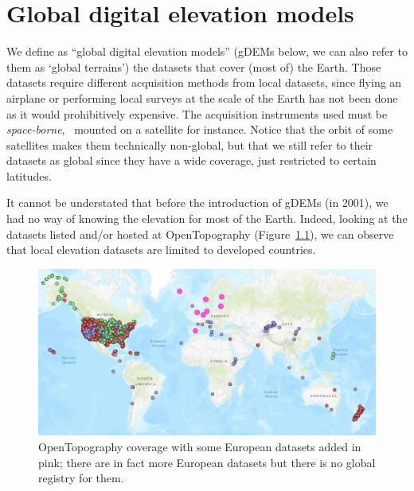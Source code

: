 
\setchapterpreamble[u]{\margintoc}
\graphicspath{{gdem/figs/}}


\chapter{Global digital elevation models}%
\label{chap:gdem}

We define as ``global digital elevation models'' (gDEMs below, we can also refer to them as `global terrains') the datasets that cover (most of) the Earth.%
Those datasets require different acquisition methods from local datasets, since flying an airplane or performing local surveys at the scale of the Earth has not been done as it would prohibitively expensive.
The acquisition instruments used must be \emph{space-borne}, \ie\ mounted on a satellite for instance.
Notice that the orbit of some satellites makes them technically non-global, but that we still refer to their datasets as global since they have a wide coverage, just restricted to certain latitudes.

%

It cannot be understated that before the introduction of gDEMs (in 2001), we had no way of knowing the elevation for most of the Earth.
Indeed, looking at the datasets listed and/or hosted at 
OpenTopography (Figure~\ref{fig:dem_coverage}), we can observe that local elevation datasets are limited to developed countries.
\begin{figure}
  \centering
  \includegraphics[width=\linewidth]{opentopography.pdf}
  \caption{OpenTopography coverage with some European datasets added in pink; there are in fact more European datasets but there is no global registry for them.}%
\label{fig:dem_coverage}
\end{figure}

